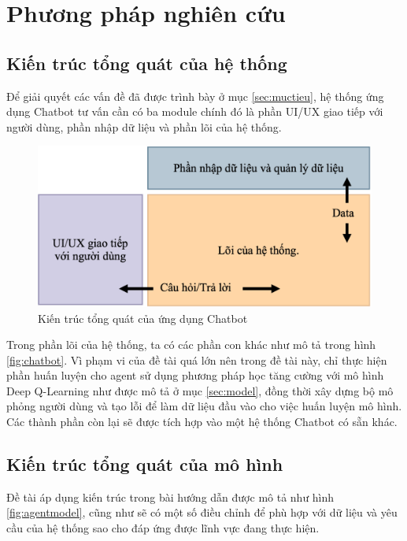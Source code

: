 \chapter{Phương pháp nghiên cứu}

\section{Kiến trúc tổng quát của hệ thống}
Để giải quyết các vấn đề đã được trình bày ở mục \ref{sec:muctieu}, hệ thống ứng dụng Chatbot tư vấn cần có ba module chính đó là phần UI/UX giao tiếp với người dùng, phần nhập dữ liệu và phần lõi của hệ thống.

\begin{center}
    \begin{figure}[h!]
        \begin{center}
         \includegraphics[scale=1]{chapter4/img/chatbot_app.png}
        \end{center}
        \caption{Kiến trúc tổng quát của ứng dụng Chatbot}
        \label{fig:chatbotapp}
    \end{figure}
\end{center}

Trong phần lõi của hệ thống, ta có các phần con khác như mô tả trong hình \ref{fig:chatbot}. Vì phạm vi của đề tài quá lớn nên trong đề tài này, chỉ thực hiện phần huấn luyện cho agent sử dụng phương pháp học tăng cường với mô hình Deep Q-Learning như được mô tả ở mục \ref{sec:model}, đồng thời xây dựng bộ mô phỏng người dùng và tạo lỗi để làm dữ liệu đầu vào cho việc huấn luyện mô hình. Các thành phần còn lại sẽ được tích hợp vào một hệ thống Chatbot có sẵn khác.

\section{Kiến trúc tổng quát của mô hình}
Đề tài áp dụng kiến trúc trong bài hướng dẫn \cite{traininggochatbot} được mô tả như hình \ref{fig:agentmodel}, cũng như sẽ có một số điều chỉnh để phù hợp với dữ liệu và yêu cầu của hệ thống sao cho đáp ứng được lĩnh vực đang thực hiện.

